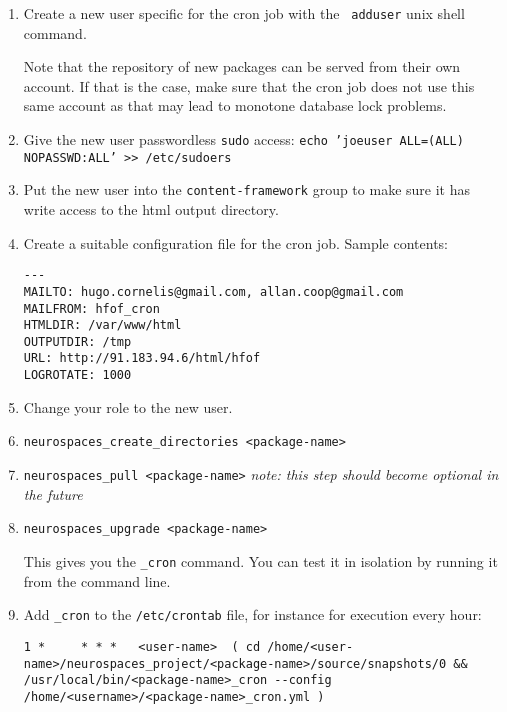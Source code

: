 \documentclass[12pt]{article}
\begin{document}
\begin{enumerate}
\item Create a new user specific for the cron job with the {\tt
    adduser} unix shell command.

  Note that the repository of new packages can be served from their
  own account.  If that is the case, make sure that the cron job does
  not use this same account as that may lead to monotone database lock
  problems.

\item Give the new user passwordless {\tt sudo} access: {\tt echo
    'joeuser ALL=(ALL) NOPASSWD:ALL' >> /etc/sudoers}

\item Put the new user into the {\tt content-framework} group to make
  sure it has write access to the html output directory.
\item Create a suitable configuration file for the cron job.  Sample
  contents:
\begin{verbatim}
---
MAILTO: hugo.cornelis@gmail.com, allan.coop@gmail.com
MAILFROM: hfof_cron
HTMLDIR: /var/www/html
OUTPUTDIR: /tmp
URL: http://91.183.94.6/html/hfof
LOGROTATE: 1000
\end{verbatim}
\item Change your role to the new user.
\item {\tt neurospaces\_create\_directories <package-name>}
\item {\tt neurospaces\_pull <package-name>} {\it note: this step should
    become optional in the future}
\item {\tt neurospaces\_upgrade <package-name>}

  This gives you the {\tt <package-name>\_cron} command.  You can test it
  in isolation by running it from the command line.
\item Add {\tt <package-name>\_cron} to the {\tt /etc/crontab} file, for
  instance for execution every hour:

\begin{verbatim}
1 *     * * *   <user-name>  ( cd /home/<user-name>/neurospaces_project/<package-name>/source/snapshots/0 && /usr/local/bin/<package-name>_cron --config /home/<username>/<package-name>_cron.yml )
\end{verbatim}
\end{enumerate}


\end{document}
